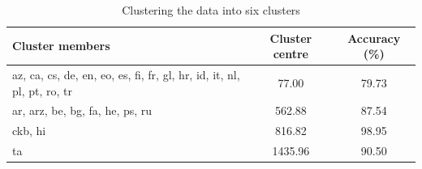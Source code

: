\begin{table}[h]
\centering
\caption{Clustering the data into six clusters}
\label{tab:clusters}
\begin{tabular}{@{}lcc@{}}
\toprule
\textbf{Cluster members} & \textbf{Cluster centre} & \textbf{Accuracy (\%)} \\
\midrule
az, ca, cs, de, en, eo, es, fi, fr, gl, hr, id, it, nl, pl, pt, ro, tr & 77.00 & 79.73 \\
ar, arz, be, bg, fa, he, ps, ru & 562.88 & 87.54 \\
ckb, hi & 816.82 & 98.95 \\
ta & 1435.96 & 90.50 \\
\bottomrule
\end{tabular}
\end{table}
